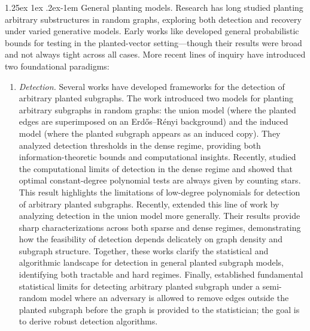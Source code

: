 \documentclass[12pt]{article}
\makeatletter
\renewcommand{\paragraph}{%
  \@startsection{paragraph}{4}%
  {\z@}{1.25ex \@plus 1ex \@minus .2ex}{-1em}%
  {\normalfont\normalsize\bfseries}%
}
\makeatother
\begin{document}
\paragraph{General planting models.} Research has long studied planting arbitrary substructures in random graphs, exploring both detection and recovery under varied generative models. Early works like \cite{addario2010combinatorial} developed general probabilistic bounds for testing in the planted-vector setting—though their results were broad and not always tight across all cases. More recent lines of inquiry have introduced two foundational paradigms:
\begin{enumerate}[leftmargin=*]
    \item \emph{Detection.} Several works have developed frameworks for the detection of arbitrary planted subgraphs. The work \cite{Huleihel2022} introduced two models for planting arbitrary subgraphs in random graphs: the union model (where the planted edges are superimposed on an Erd\H{o}s--R\'enyi background) and the induced model (where the planted subgraph appears as an induced copy). They analyzed detection thresholds in the dense regime, providing both information-theoretic bounds and computational insights. Recently, \cite{pmlr-v247-yu24a} studied the computational limits of detection in the dense regime and showed that optimal constant-degree polynomial tests are always given by counting stars. This result highlights the limitations of low-degree polynomials for detection of arbitrary planted subgraphs. Recently, \cite{elimelech2025detecting} extended this line of work by analyzing detection in the union model more generally. Their results provide sharp characterizations across both sparse and dense regimes, demonstrating how the feasibility of detection depends delicately on graph density and subgraph structure. Together, these works clarify the statistical and algorithmic landscape for detection in general planted subgraph models, identifying both tractable and hard regimes. Finally, \cite{ElimelechHuleihel2025SemiRandom} established fundamental statistical limits for detecting arbitrary planted subgraph under a semi-random model where an adversary is allowed to remove edges outside the planted subgraph before the graph is provided to the statistician; the goal is to derive robust detection algorithms. 

\end{enumerate}
\end{document}
